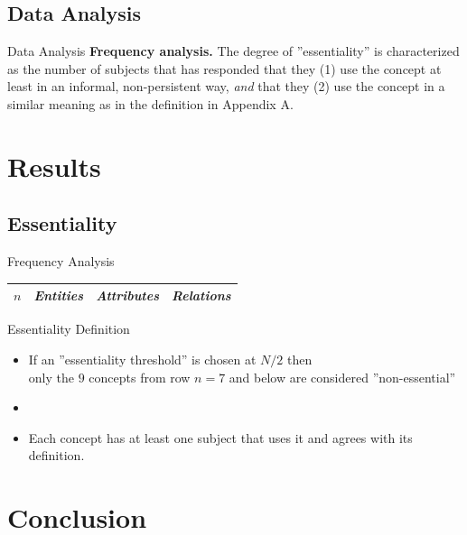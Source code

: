 \documentclass{slides}
\begin{document}
\subsection{Data Analysis}
\begin{Slide}{Data Analysis}
\textbf{Frequency analysis.} The degree of ''essentiality'' is characterized as the number of subjects that has responded that they (1) use the concept at least in an informal, non-persistent way, \textit{and} that they (2) use the concept in a similar meaning as in the definition in Appendix A. 


\end{Slide}

\section{Results}
\subsection{Essentiality}
\begin{Slide}{Frequency Analysis}
\fontsize{6}{8}\selectfont

\begin{tabular}{l | p{} | p{} | p{}}
\textit{$n$} & \textit{Entities} & \textit{Attributes} & \textit{Relations} \\ \hline

\end{tabular}

\end{Slide}

\begin{Slide}{Essentiality Definition}
\begin{itemize}
\item If an ''essentiality threshold'' is chosen at $N/2$ then \\ only the $9$ concepts from row $n = 7$ and below are considered ''non-essential''
\item {} 
\item Each concept has at least one subject that uses it and agrees with its definition. 
\end{itemize}

\end{Slide}

\section{Conclusion}
\end{document}
